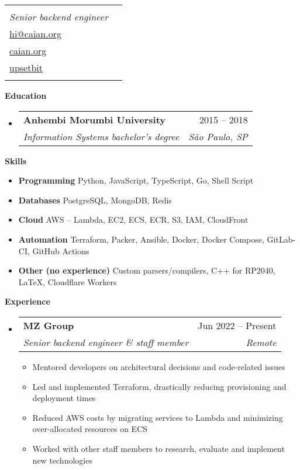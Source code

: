 \documentclass[letterpaper,12pt]{article}[leftmargin=*]
\makeatletter
\def \fullname {Caian Ertl}
\def \subtitle {Senior backend engineer}
\def \emailicon {\faEnvelope}
\def \emaillink {mailto:hi@caian.org}
\def \emailtext {hi@caian.org}
\def \phoneicon {\faPhone}
\def \phonetext {+55 (11) 98161-5593}
\def \githubicon {\faGithub}
\def \githublink {https://github.com/upsetbit}
\def \githubtext {upsetbit}
\def \websiteicon {\faGlobe}
\def \websitelink {https://caian.org}
\def \websitetext {caian.org}
\def \headertype {\singlecol} %
\def \entryspacing {-0pt}
\def \phone {\phoneicon \hspace{3pt}{ \phonetext}}
\def \email {\emailicon \hspace{3pt}\href{\emaillink}{\emailtext}}
\def \github {\githubicon \hspace{3pt}\href{\githublink}{\githubtext}}
\def \website {\websiteicon \hspace{3pt}\href{\websitelink}{\websitetext}}
\renewcommand{\section}[2]{\vspace{5pt}
  \colorbox{secondary}{\color{white}\raggedbottom\normalsize\textbf{{#1}{\hspace{7pt}#2}}}
}
\newcommand{\resumeEntryStart}{\begin{itemize}[leftmargin=2.5mm]}
\newcommand{\resumeEntryEnd}{\end{itemize}\vspace{\entryspacing}}
\newcommand{\resumeItemListStart}{\begin{itemize}[leftmargin=4.5mm]}
\newcommand{\resumeItemListEnd}{\end{itemize}}
\newcommand{\resumeItem}[1]{
  \item\small{
    {#1 \vspace{-2pt}}
  }
}
\newcommand{\resumeEntryTSDL}[4]{
  \vspace{-1pt}\item[]
    \begin{tabularx}{0.97\textwidth}{X@{\hspace{60pt}}r}
      \textbf{\color{primary}#1} & {\firabook\color{accent}\small#2} \\
      \textit{\color{accent}\small#3} & \textit{\color{accent}\small#4} \\
    \end{tabularx}\vspace{-6pt}
}
\newcommand{\resumeEntryS}[2]{
  \item[]\small{
    \textbf{\color{primary}#1 }{ #2 \vspace{-6pt}}
  }
}
\newcommand{\doublecol}[5]{
  \begin{tabularx}{\textwidth}{Xr}
    {
      \begin{tabular}[c]{l}
        \fontsize{35}{45}\selectfont{\color{primary}{{\textbf{\fullname}}}} \\
        {\textit{\subtitle}} %
      \end{tabular}
    } & {
      \begin{tabular}[c]{l@{\hspace{1.5em}}l}
        {\small#3} & {\small#1} \\
        {\small#4} & {\small#2} \\
        {\small#5}
      \end{tabular}
    }
  \end{tabularx}
}
\newcommand{\singlecol}[5]{
  \begin{tabularx}{\textwidth}{Xr}
    {
      \begin{tabular}[b]{l}
        \fontsize{35}{45}\selectfont{\color{primary}{{\textbf{\fullname}}}} \\
        {\textit{\subtitle}} %
      \end{tabular}
    } & {
      \begin{tabular}[c]{l}
        {\small#1} \\
        {\small#2} \\
        {\small#3} \\
        {\small#4} \\
        {\small#5}
      \end{tabular}
    }
  \end{tabularx}
}
\makeatother
\begin{document}


\headertype{\phone}{\email}{\website}{\github}{} %
\vspace{-10pt} %

\section{\faGraduationCap}{Education}

  \resumeEntryStart
    \resumeEntryTSDL
      {Anhembi Morumbi University}{2015 -- 2018}
      {Information Systems bachelor’s degree}{São Paulo, SP}
  \resumeEntryEnd

\section{\faGears}{Skills}
 \resumeEntryStart
  \resumeEntryS{Programming } {Python, JavaScript, TypeScript, Go, Shell Script}
  \resumeEntryS{Databases } {PostgreSQL, MongoDB, Redis}
  \resumeEntryS{Cloud } {AWS -- Lambda, EC2, ECS, ECR, S3, IAM, CloudFront}
  \resumeEntryS{Automation } {Terraform, Packer, Ansible, Docker, Docker Compose, GitLab-CI, GitHub Actions}
  \resumeEntryS{Other (no experience) } {Custom parsers/compilers, C++ for RP2040, \LaTeX, Cloudflare Workers}
 \resumeEntryEnd

\section{\faPieChart}{Experience}

  \resumeEntryStart
    \resumeEntryTSDL
      {MZ Group}{Jun 2022 -- Present}
      {Senior backend engineer \& staff member}{Remote}
    \resumeItemListStart
      \resumeItem {Mentored developers on architectural decisions and code-related issues}
      \resumeItem {Led and implemented Terraform, drastically reducing provisioning and deployment times}
      \resumeItem {Reduced AWS costs by migrating services to Lambda and minimizing over-allocated resources on ECS}
      \resumeItem {Worked with other staff members to research, evaluate and implement new technologies}
    \resumeItemListEnd
  \resumeEntryEnd
\end{document}
